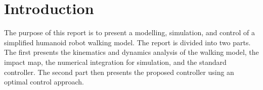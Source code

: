 \section{Introduction}
\label{sec:introduction}

The purpose of this report is to present a modelling, simulation, and control of a simplified humanoid robot walking model. The report is divided into two parts. The first presents the kinematics and dynamics analysis of the walking model, the impact map, the numerical integration for simulation, and the standard controller. The second part then presents the proposed controller using an optimal control approach. 





